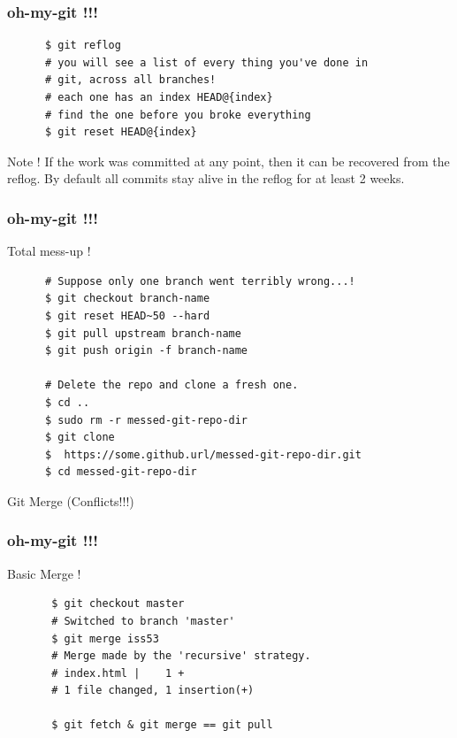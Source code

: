 \documentclass[10pt]{beamer}
\begin{document}
\begin{frame}[fragile]
  \frametitle{oh-my-git !!!}
  \begin{example}[Solution]
    \begin{verbatim}
      $ git reflog
      # you will see a list of every thing you've done in
      # git, across all branches!
      # each one has an index HEAD@{index}
      # find the one before you broke everything
      $ git reset HEAD@{index}
    \end{verbatim}
  \end{example}
  \pause
  \begin{block}{Note !}
    If the work was committed at any point, then it can be recovered from the reflog.
    By default all commits stay alive in the reflog for at least 2 weeks.
  \end{block}
\end{frame}

\begin{frame}[fragile]
  \frametitle{oh-my-git !!!}
  \begin{block}{Total mess-up !}
    \begin{verbatim}
      # Suppose only one branch went terribly wrong...!
      $ git checkout branch-name
      $ git reset HEAD~50 --hard
      $ git pull upstream branch-name
      $ git push origin -f branch-name

      # Delete the repo and clone a fresh one.
      $ cd ..
      $ sudo rm -r messed-git-repo-dir
      $ git clone
      $  https://some.github.url/messed-git-repo-dir.git
      $ cd messed-git-repo-dir
    \end{verbatim}
  \end{block}
\end{frame}

\begin{frame}
  \begin{center}
    \Huge{Git Merge (Conflicts!!!)}
  \end{center}
\end{frame}

\begin{frame}[fragile]
  \frametitle{oh-my-git !!!}
  \begin{block}{Basic Merge !}
    \begin{verbatim}
       $ git checkout master
       # Switched to branch 'master'
       $ git merge iss53
       # Merge made by the 'recursive' strategy.
       # index.html |    1 +
       # 1 file changed, 1 insertion(+)

       $ git fetch & git merge == git pull
    \end{verbatim}
  \end{block}
\end{frame}
\end{document}
